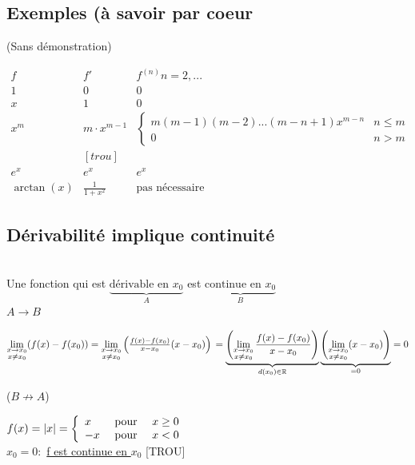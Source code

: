 \documentclass[12pt,a4paper]{article}
\begin{document}
{\subsection{Exemples (à savoir par coeur}
(Sans démonstration)\\
\begin{center}
$\begin{array}{ccc}
f & f' & f^{(n)} n = 2,...\\
1 & 0 & 0\\
x & 1 & 0\\
x^m & m\cdot x^{m-1} & 
\left\{ \begin{array}{ll}
m(m-1)(m-2)...(m-n+1)x^{m-n} & n \leq m\\
0 & n > m
\end{array} \right.\\
&[trou]&\\
e^x & e^x & e^x\\
\arctan(x) & \frac{1}{1+x^2} & \mbox{pas nécessaire}
\end{array}$
\end{center}
\subsection{Dérivabilité implique continuité}
\begin{boite}
\Theoreme\\
Une fonction qui est $\underbrace{\mbox{dérivable en }x_0}_A$ est $\underbrace{\mbox{continue en }x_0}_B$\\
$A \to B$
\end{boite}
 $\lim\limits_{\substack{x \to x_0 \\ x \neq x_0}}(f(x)- f(x_0)) = \lim\limits_{\substack{x \to x_0\\ x \neq x_0}}\left(\frac{f(x) - f(x_0)}{x - x_0} (x-x_0)\right)\\
 = \underbrace{\left(\lim\limits_{\substack{x \to x_0 \\ x \neq x_0}}\frac{f(x) - f(x_0)}{x-x_0}\right)}_{d(x_0) \in \mathbb{R}}\underbrace{\left(\lim\limits_{\substack{x \to x_0 \\ x \neq x_0}}(x-x_0)\right)}_{=0} = 0$\\
\begin{center}
 ($B\not \to A$)
\end{center}
 $f(x) = |x| = 
\left\{
\begin{array}{lll}
x & \mbox{ pour } & x \geq 0\\
-x & \mbox{ pour } & x < 0
\end{array}
\right.$\\
$x_0 = 0:$ \underline{f est continue en $x_0$}
[TROU]
}
\end{document}
